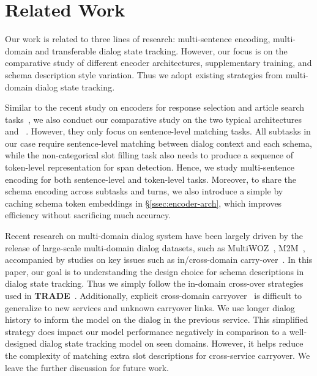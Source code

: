 \section{Related Work}
\label{sec:sgd:related-work}
Our work is related to three lines of research: multi-sentence
encoding, multi-domain and transferable dialog state
tracking. However, our focus is on the comparative study of different
encoder architectures, supplementary training, and schema
description style variation. Thus we adopt existing strategies from
multi-domain dialog state tracking.

 Similar to the recent
study on encoders for response selection and article search
tasks~\citet{humeau2019poly}, we also conduct our comparative study on
the two typical architectures \CE~\cite{bordes2014open,
  lowe2015ubuntu} and
\DE~\cite{wu2017sequential,yang2018response}. However, they only focus
on sentence-level matching tasks. All subtasks in our case require
sentence-level matching between dialog context and each schema, while
the non-categorical slot filling task also needs to produce a sequence
of token-level representation for span detection. Hence, we study
multi-sentence encoding for both sentence-level and token-level
tasks. Moreover, to share the schema encoding across subtasks and
turns, we also introduce a simple \FE by caching schema token
embeddings in \S\ref{ssec:encoder-arch}, which improves efficiency
without sacrificing much accuracy.

 Recent research on
multi-domain dialog system have been largely driven by the release of
large-scale multi-domain dialog datasets, such as
MultiWOZ~\cite{budzianowski2018multiwoz},
M2M~\cite{shah-etal-2018-bootstrapping}, accompanied by studies on key
issues such as in/cross-domain carry-over~\cite{
  kim2019efficient}. In this paper, our goal is to understanding the
design choice for schema descriptions in dialog state tracking.
Thus we simply follow the in-domain cross-over strategies used in {\bf
  TRADE}~\cite{wu2019transferable}. Additionally, explicit cross-domain
carryover~\cite{naik2018contextual} is difficult to generalize to new
services and unknown carryover links. We use longer dialog history to
inform the model on the dialog in the previous service. This
simplified strategy does impact our model performance negatively in
comparison to a well-designed dialog state tracking model on seen
domains. However, it helps reduce the complexity of matching extra slot
descriptions for cross-service carryover. We leave the further
discussion for future work.

